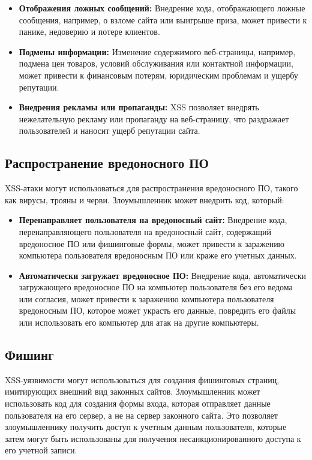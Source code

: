 \documentclass[a4paper,12pt]{diplom}
\begin{document}
	 \begin{itemize}
	 	\item \textbf{Отображения ложных сообщений:}  Внедрение кода, отображающего ложные сообщения, например, о взломе сайта или выигрыше приза, может привести к панике, недоверию и потере клиентов.
	 	\item \textbf{Подмены информации:}  Изменение содержимого веб-страницы, например, подмена цен товаров, условий обслуживания или контактной информации, может привести к финансовым потерям, юридическим проблемам и ущербу репутации.
	 	\item \textbf{Внедрения рекламы или пропаганды:} XSS позволяет внедрять нежелательную рекламу или пропаганду на веб-страницу, что раздражает пользователей и наносит ущерб репутации сайта.
	\end{itemize}
	 	
	 \subsection{Распространение вредоносного ПО}
	 	
	 XSS-атаки могут использоваться для распространения вредоносного ПО, такого как вирусы, трояны и черви. Злоумышленник может внедрить код, который:
	 	
	 \begin{itemize}
	 	\item \textbf{Перенаправляет пользователя на вредоносный сайт:} Внедрение кода, перенаправляющего пользователя на вредоносный сайт, содержащий вредоносное ПО или фишинговые формы, может привести к заражению компьютера пользователя вредоносным ПО или краже его учетных данных. 
	 	\item \textbf{Автоматически загружает вредоносное ПО:}  Внедрение кода, автоматически загружающего вредоносное ПО на компьютер пользователя без его ведома или согласия, может привести к заражению компьютера пользователя вредоносным ПО, которое может украсть его данные, повредить его файлы или использовать его компьютер для атак на другие компьютеры. 
	 \end{itemize}
	 		
	 \subsection{Фишинг}
	 		
	 XSS-уязвимости могут использоваться для создания фишинговых страниц, имитирующих внешний вид законных сайтов. Злоумышленник может использовать код для создания формы входа, которая отправляет данные пользователя на его сервер, а не на сервер законного сайта. Это позволяет злоумышленнику получить доступ к учетным данным пользователя, которые затем могут быть использованы для получения несанкционированного доступа к его учетной записи.
	 		
\end{document}
